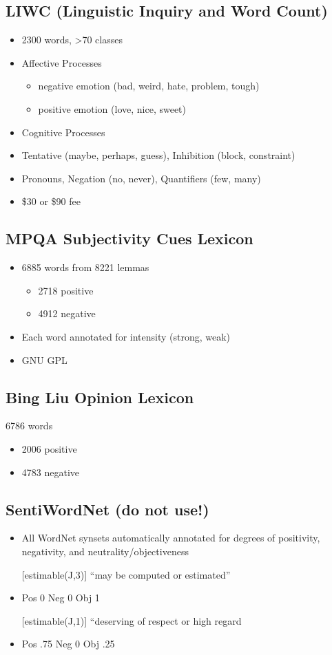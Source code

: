 \documentclass[11pt]{article}
\theoremstyle{definition}
\begin{document}
\subsection{LIWC (Linguistic Inquiry and Word Count)}
\begin{itemize}
  \item 2300 words, >70 classes
  \item Affective Processes
  \begin{itemize}
    \item negative emotion (bad, weird, hate, problem, tough)
    \item positive emotion (love, nice, sweet)
  \end{itemize}
  \item Cognitive Processes
  \item Tentative (maybe, perhaps, guess), Inhibition (block, constraint)
  \item Pronouns, Negation (no, never), Quantifiers (few, many)
  \item \$30 or \$90 fee
\end{itemize}

\subsection{MPQA Subjectivity Cues Lexicon}
\begin{itemize}
  \item 6885 words from 8221 lemmas
  \begin{itemize}
    \item 2718 positive
    \item 4912 negative
  \end{itemize}
  \item Each word annotated for intensity (strong, weak)
  \item GNU GPL
\end{itemize}

\subsection{Bing Liu Opinion Lexicon}
6786 words
\begin{itemize}
  \item 2006 positive
  \item 4783 negative
\end{itemize}

\subsection{SentiWordNet (do not use!)}
\begin{itemize}
  \item All WordNet synsets automatically annotated for degrees of positivity,
  negativity, and neutrality/objectiveness
  \item [] [estimable(J,3)] “may be computed or estimated”
  \item Pos 0 Neg 0 Obj 1
  \item [] [estimable(J,1)] “deserving of respect or high regard
  \item Pos .75 Neg 0 Obj .25
\end{itemize}
\end{document}
